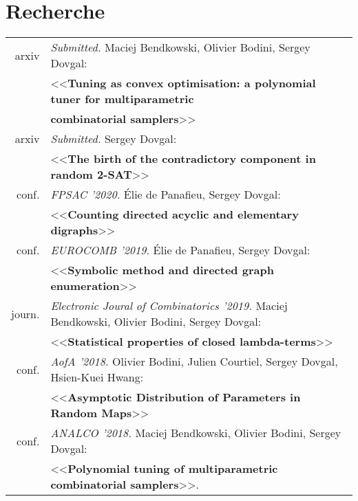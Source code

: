 \documentclass[a4paper,10pt]{article} %
\begin{document}
\vfill


\section{Recherche}
\begin{tabular}{rl}
arxiv & \textit{Submitted.} Maciej Bendkowski, Olivier Bodini, Sergey Dovgal:
    \\&
    <<\textbf{Tuning as convex optimisation: a polynomial tuner for
    multiparametric}\\
    &\textbf{combinatorial samplers}>>
\\
arxiv & \textit{Submitted.} Sergey Dovgal:
    \\&
<<\textbf{The birth of the contradictory component in random 2-SAT}>>
\\
conf. & \textit{FPSAC '2020.} Élie de Panafieu, Sergey Dovgal:
    \\&
<<\textbf{Counting directed acyclic and elementary digraphs}>>
\\
conf. & \textit{EUROCOMB '2019.} Élie de Panafieu, Sergey Dovgal:
    \\&
<<\textbf{Symbolic method and directed graph enumeration}>>
\\
journ. & \textit{Electronic Joural of Combinatorics '2019.}
Maciej Bendkowski, Olivier Bodini, Sergey
     Dovgal:\\&
<<\textbf{Statistical properties of closed lambda-terms}>>
\\
conf. & \textit{AofA '2018.} Olivier Bodini, Julien Courtiel, Sergey Dovgal, Hsien-Kuei Hwang:\\&
<<\textbf{Asymptotic Distribution of Parameters in Random Maps}>>
\\
conf. & \textit{ANALCO '2018.} Maciej Bendkowski, Olivier Bodini, Sergey
    Dovgal:
\\
& <<\textbf{Polynomial tuning 
of multiparametric combinatorial samplers}>>.

\end{tabular}
\end{document}
